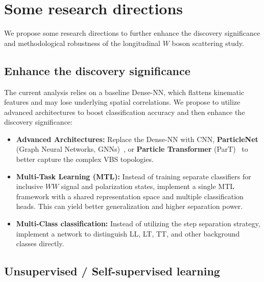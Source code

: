\documentclass[12pt]{article}
\begin{document}


\section{Some research directions}%
\label{sec:some_research_directions}

    We propose some research directions to further enhance the discovery significance and methodological robustness of the longitudinal $W$ boson scattering study.

    \subsection{Enhance the discovery significance}%
    \label{sub:enhance_the_discovery_significance}

        The current analysis relies on a baseline Dense-NN, which flattens kinematic features and may lose underlying spatial correlations. We propose to utilize advanced architectures to boost classification accuracy and then enhance the discovery significance:
        \begin{itemize}
            \item \textbf{Advanced Architectures:} Replace the Dense-NN with CNN, \textbf{ParticleNet} (Graph Neural Networks, GNNs)~\cite{Qu:2019gqs}, or \textbf{Particle Transformer} (ParT)~\cite{Qu:2022mxj} to better capture the complex VBS topologies.
            \item \textbf{Multi-Task Learning (MTL):} Instead of training separate classifiers for inclusive $WW$ signal and polarization states, implement a single MTL framework with a shared representation space and multiple classification heads. This can yield better generalization and higher separation power.
            \item \textbf{Multi-Class classification:} Instead of utilizing the step separation strategy, implement a network to distinguish LL, LT, TT, and other background classes directly.
        \end{itemize}


    \subsection{Unsupervised / Self-supervised learning}%
    \label{sub:unsupervised_self_supervised_learning}
\end{document}
